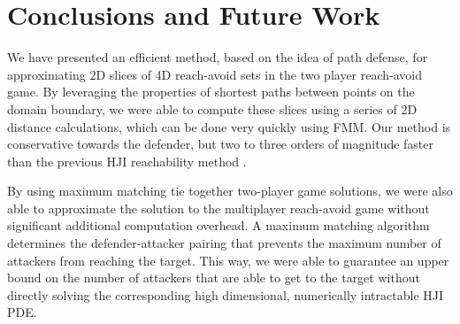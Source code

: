 \section{Conclusions and Future Work} \label{sec:conc}
We have presented an efficient method, based on the idea of path defense, for approximating 2D slices of 4D reach-avoid sets in the two player reach-avoid game. By leveraging the properties of shortest paths between points on the domain boundary, we were able to compute these slices using a series of 2D distance calculations, which can be done very quickly using FMM. Our method is conservative towards the defender, but two to three orders of magnitude faster than the previous HJI reachability method \cite{Chen2014}.

By using maximum matching tie together two-player game solutions, we were also able to approximate the solution to the multiplayer reach-avoid game without significant additional computation overhead. A maximum matching algorithm determines the defender-attacker pairing that prevents the maximum number of attackers from reaching the target. This way, we were able to guarantee an upper bound on the number of attackers that are able to get to the target without directly solving the corresponding high dimensional, numerically intractable HJI PDE. 

